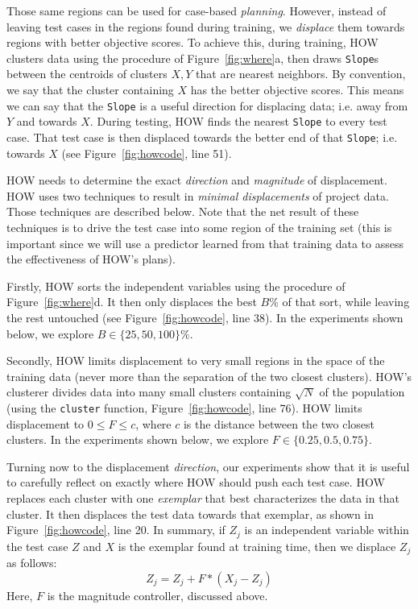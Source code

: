 \documentclass[conference]{IEEEtran}
\newcommand{\fig}[1]{Figure~\ref{fig:#1}}
\begin{document}




Those same regions can be used for case-based 
{\em planning}. However,  instead of leaving test cases in the regions
found during training, we {\em displace} them towards regions
with better objective scores.
To achieve this, 
during training, HOW clusters data using the procedure of \fig{where}a,
then draws {\tt Slope}s between the centroids of  clusters $X,Y$ that are nearest
neighbors.
By convention, we say that the cluster containing $X$ has the  better objective scores. This means we can say that the {\tt Slope} is a useful direction for displacing
data; i.e.  away from $Y$ and towards $X$. 
 During testing,  HOW   finds the  nearest {\tt Slope} to every test case. That  test case is   then displaced towards the better end
of that {\tt Slope}; i.e. towards  $X$ (see \fig{howcode}, line 51).

 HOW needs to  determine the  exact {\em direction} and {\em magnitude} of 
displacement.   
HOW uses two techniques to result in 
{\em minimal displacements} of project data. Those techniques are described below. Note
 that the net result of these techniques is to drive the test case into some region of the training 
 set (this is important since we will use a predictor learned from that training data to assess
 the effectiveness of HOW's plans).
 
 Firstly,
HOW sorts  the independent variables
using the procedure of  \fig{where}d. It then only
displaces the    best $B$\%  of that sort, while leaving the rest untouched
(see \fig{howcode}, line 38).
In  the experiments shown below,  we explore   \mbox{$B \in \{25,50,100\}\%$}.

Secondly, HOW   limits displacement
to very small regions in the space of the training data (never more than the separation
of the two closest clusters).  HOW's clusterer divides  data into many   small clusters containing
$\sqrt{N}$ of the population (using the {\tt cluster} function, \fig{howcode}, line 76).
HOW   limits displacement to  \mbox{$0 \le F \le c$}, where
$c$ is the distance between the two closest clusters. 
In  the experiments shown below,  we explore
\mbox{$F\in \{0.25, 0.5, 0.75\}$}.

Turning now to the displacement {\em direction},
our experiments show that it is useful to  carefully reflect on exactly where HOW should  push each test case.
HOW replaces each cluster   with one {\em exemplar} that best
characterizes the data in that cluster. It then displaces the
test data towards that exemplar, as shown in \fig{howcode}, line 20. In summary, 
if  $Z_j$ is an independent variable within the
test case $Z$ and  $X$ is the exemplar found at training time,
then we displace $Z_j$ as follows:
\[Z_j =  Z_j + F*(X_j - Z_j)\]
Here, $F$ is the  magnitude controller, discussed above. 
\end{document}
